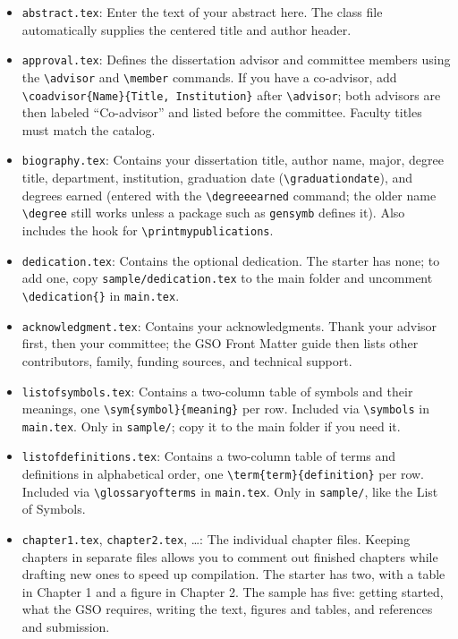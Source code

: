 \begin{itemize}
  \item \texttt{abstract.tex}: Enter the text of your abstract here. The class file automatically supplies the centered title and author header.

  \item \texttt{approval.tex}: Defines the dissertation advisor and committee members using the \verb+\advisor+ and \verb+\member+ commands. If you have a co-advisor, add \verb+\coadvisor{Name}{Title, Institution}+ after \verb+\advisor+; both advisors are then labeled ``Co-advisor'' and listed before the committee. Faculty titles must match the catalog.

  \item \texttt{biography.tex}: Contains your dissertation title, author name, major, degree title, department, institution, graduation date (\verb+\graduationdate+), and degrees earned (entered with the \verb+\degreeearned+ command; the older name \verb+\degree+ still works unless a package such as \texttt{gensymb} defines it). Also includes the hook for \verb+\printmypublications+.

  \item \texttt{dedication.tex}: Contains the optional dedication. The starter has none; to add one, copy \texttt{sample/dedication.tex} to the main folder and uncomment \verb+\dedication{}+ in \texttt{main.tex}.

  \item \texttt{acknowledgment.tex}: Contains your acknowledgments. Thank your advisor first, then your committee; the GSO Front Matter guide then lists other contributors, family, funding sources, and technical support.

  \item \texttt{listofsymbols.tex}: Contains a two-column table of symbols and their meanings, one \verb+\sym{symbol}{meaning}+ per row. Included via \verb+\symbols+ in \texttt{main.tex}. Only in \texttt{sample/}; copy it to the main folder if you need it.

  \item \texttt{listofdefinitions.tex}: Contains a two-column table of terms and definitions in alphabetical order, one \verb+\term{term}{definition}+ per row. Included via \verb+\glossaryofterms+ in \texttt{main.tex}. Only in \texttt{sample/}, like the List of Symbols.


  \item \texttt{chapter1.tex}, \texttt{chapter2.tex}, \ldots: The individual chapter files. Keeping chapters in separate files allows you to comment out finished chapters while drafting new ones to speed up compilation. The starter has two, with a table in Chapter 1 and a figure in Chapter 2. The sample has five: getting started, what the GSO requires, writing the text, figures and tables, and references and submission.


\end{itemize}
